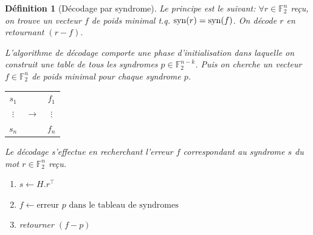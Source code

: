 \documentclass[a4paper,10pt,twocolumn]{article}
\theoremstyle{break}
\newcommand{\syn}[1]{\mathop{\rm{syn}}(#1)}
\newcommand{\F}{\mathbb{F}}
\newcommand{\FF}{\F_2}
\newcommand{\FFn}[1]{\FF^{#1}}
\newtheorem{mydef}{Définition}
\begin{document}
\begin{mydef}[Décodage par syndrome]
  Le principe est le suivant: $\forall r \in \FFn{n}$ reçu, on trouve un vecteur $f$ de poids minimal t.q. $\syn{r} = \syn{f}$. On décode $r$ en retournant $(r-f)$.
  
  L'algorithme de décodage comporte une phase d'initialisation dans laquelle on construit une table de tous les syndromes $p \in \FFn{n-k}$. 
  Puis on cherche un vecteur $f \in \FFn{n}$ de poids minimal pour chaque syndrome $p$. 
  
 \begin{center}
  \begin{tabular}{|c|c|c|}
   \cline{1-1}\cline{3-3}  $s_1$ & & $f_1$ \\ \cline{1-1}\cline{3-3} 
   $\vdots$ & $ \longrightarrow $ & $\vdots$ \\
   \cline{1-1}\cline{3-3}  $s_n$ & & $f_n$ \\ \cline{1-1}\cline{3-3} 
  \end{tabular}
\end{center}
  
  Le décodage s'effectue en recherchant l'erreur $f$ correspondant au syndrome $s$ du mot $r \in \FFn{n}$ reçu.
 \begin{enumerate}
  \item $s \leftarrow H.r^\top$
  \item $f \leftarrow \text{erreur $p$ dans le tableau de syndromes}$
  \item retourner $(f-p)$
 \end{enumerate}
\end{mydef}
\end{document}
